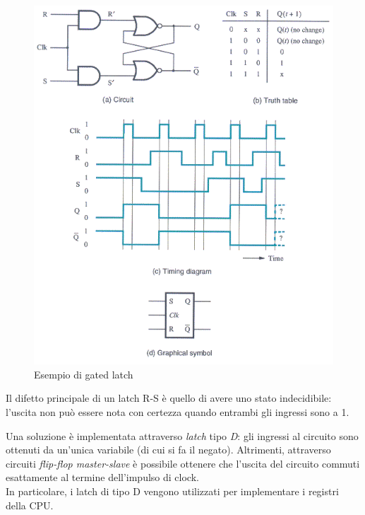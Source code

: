 \documentclass[class=book, crop=false]{standalone}
\begin{document}
\begin{figure}[H]
	\centering
	\includegraphics[width=\textwidth,keepaspectratio]{gated_latch.png}
	\caption{Esempio di gated latch}
\end{figure}
Il difetto principale di un latch R-S è quello di avere uno stato indecidibile: l'uscita non può essere nota con certezza quando entrambi gli ingressi sono a 1.

Una soluzione è implementata attraverso \emph{latch} tipo \emph{D}: gli ingressi al circuito sono ottenuti da un'unica variabile (di cui si fa il negato). Altrimenti, attraverso circuiti \emph{flip-flop master-slave} è possibile ottenere che l’uscita del circuito commuti esattamente al termine dell’impulso di clock.\\
In particolare, i latch di tipo D vengono utilizzati per implementare i registri della CPU.
\end{document}
